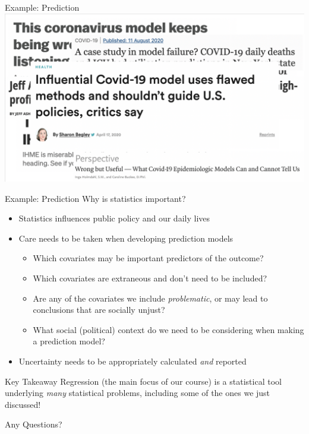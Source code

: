 \documentclass[10pt,t]{beamer}
\begin{document}
\begin{frame}[c]{Example: Prediction}
\centering \includegraphics[scale=0.35]{ihme7.png}
\end{frame}

\begin{frame}{Example: Prediction}
Why is statistics important?
\begin{itemize}
	\item Statistics influences public policy and our daily lives
	\item Care needs to be taken when developing prediction models
	\begin{itemize}
		\item Which covariates may be important predictors of the outcome?
		\item Which covariates are extraneous and don't need to be included?
		\item Are any of the covariates we include \textit{problematic}, or may lead to conclusions that are socially unjust?
		\item What social (political) context do we need to be considering when making a prediction model?
	\end{itemize}
	\item Uncertainty needs to be appropriately calculated \textit{and} reported
\end{itemize}
\end{frame}

\begin{frame}{Key Takeaway}
Regression (the main focus of our course) is a statistical tool underlying \textit{many} statistical problems, including some of the ones we just discussed!
\end{frame}

\begin{frame}[c]
\centering \huge Any Questions?
\end{frame}
\end{document}
